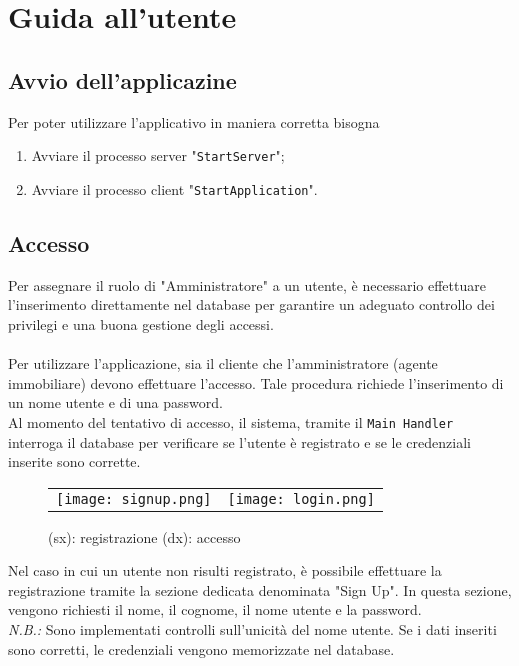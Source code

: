 \chapter{Guida all'utente}
\section{Avvio dell'applicazine}
\noindent Per poter utilizzare l'applicativo in maniera corretta bisogna
\begin{enumerate}
    \item Avviare il processo server "\texttt{StartServer}";
    \item Avviare il processo client "\texttt{StartApplication}".
\end{enumerate}

\section{Accesso}
\noindent Per assegnare il ruolo di "Amministratore" a un utente, è necessario effettuare l'inserimento direttamente nel database per garantire un adeguato controllo dei privilegi e una buona gestione degli accessi.\\
\\
Per utilizzare l'applicazione, sia il cliente che l'amministratore (agente immobiliare) devono effettuare l'accesso. Tale procedura richiede l'inserimento di un nome utente e di una password.\\
Al momento del tentativo di accesso, il sistema, tramite il \texttt{Main Handler} interroga il database per verificare se l'utente è registrato e se le credenziali inserite sono corrette.\\

\begin{figure}[h]
\begin{tabular}{ll}
\texttt{[image: signup.png]}
&
\texttt{[image: login.png]}
\end{tabular}
\caption{(sx): registrazione (dx): accesso}
\label{Fig:Race}
\end{figure}

\noindent Nel caso in cui un utente non risulti registrato, è possibile effettuare la registrazione tramite la sezione dedicata denominata "Sign Up". In questa sezione, vengono richiesti il nome, il cognome, il nome utente e la password.\\
\textit{N.B.:} Sono implementati controlli sull'unicità del nome utente. Se i dati inseriti sono corretti, le credenziali vengono memorizzate nel database.
